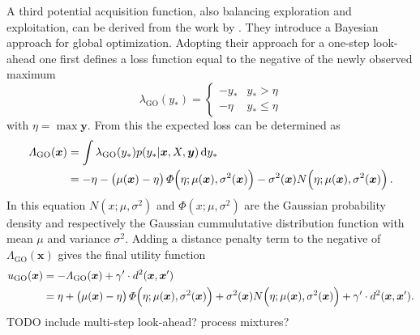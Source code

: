 \documentclass[11pt,a4paper]{scrreprt}
\newcommand{\vc}[1]{\bm{#1}}
\newcommand{\ped}[1]{_{\mathrm{#1}}}
\begin{document}
A third potential acquisition function, also balancing exploration and 
exploitation, can be derived from the work by \textcite{Osborne:2009tn}. They 
introduce a Bayesian approach for global optimization. Adopting their approach 
for a one-step look-ahead one first defines a loss function equal to the 
negative of the newly observed maximum
\begin{equation}
    \lambda\ped{GO} (y_*) = \left\{ \begin{array}{ll}-y_* & y_* > \eta \\ -\eta 
            & y_* \leq \eta \end{array} \right.
\end{equation}
with $\eta = \max \vc y$. From this the expected loss can be determined as
\begin{equation}\begin{split}
    \varLambda\ped{GO}(\vc x) &= \int \lambda\ped{GO}(y_*) p(y_* | \vc x, X, \vc 
    y) \dif y_* \\
    &= -\eta - \del{\mu(\vc x) - \eta} \varPhi\!\del{\eta; \mu(\vc x), 
        \sigma^2(\vc x)} - \sigma^2(\vc x) N\!\del{\eta; \mu(\vc x), 
        \sigma^2(\vc x)}
    \text{.}
\end{split}\end{equation}
In this equation $N(x; \mu, \sigma^2)$ and $\varPhi(x; \mu, \sigma^2)$ are the 
Gaussian probability density and respectively the Gaussian cummulutative 
distribution function with mean $\mu$ and variance $\sigma^2$. Adding a distance 
penalty term to the negative of $\varLambda\ped{GO}(\vc x)$ gives the final 
utility function
\begin{equation}\begin{split}
    u\ped{GO}(\vc x) &= -\varLambda\ped{GO}(\vc x) + \gamma' \cdot d^2(\vc x, 
    \vc x') \\
    &= \eta + \del{\mu(\vc x) - \eta} \varPhi\!\del{\eta; \mu(\vc x), 
        \sigma^2(\vc x)} + \sigma^2(\vc x) N\!\del{\eta; \mu(\vc x), 
        \sigma^2(\vc x)} + \gamma' \cdot d^2(\vc x, \vc x')
    \text{.}
\end{split}\end{equation}
TODO include multi-step look-ahead? process mixtures?
\end{document}
